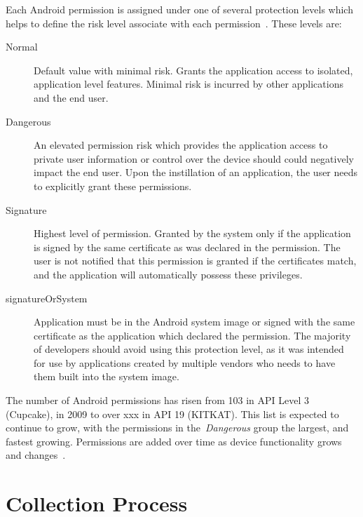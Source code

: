 \documentclass{sig-alternate}
\begin{document}
Each Android permission is assigned under one of several protection levels which helps to define the risk level associate with each permission~\cite{permissionLevelsURL}. These levels are:

\begin{description}
  \item[Normal] Default value with minimal risk. Grants the application access to isolated, application level features. Minimal risk is incurred by other applications and the end user.
  \item[Dangerous] An elevated permission risk which provides the application access to private user information or control over the device should could negatively impact the end user. Upon the instillation of an application, the user needs to explicitly grant these permissions.
\item[Signature] Highest level of permission. Granted by the system only if the application is signed by the same certificate as was declared in the permission. The user is not notified that this permission is granted if the certificates match, and the application will automatically possess these privileges. 
  \item[signatureOrSystem] Application must be in the Android system image or signed with the same certificate as the application which declared the permission. The majority of developers should avoid using this protection level, as it was intended for use by applications created by multiple vendors who needs to have them built into the system image. 

\end{description}


The number of Android permissions has risen from 103 in API Level 3 (Cupcake), in 2009 to over xxx in API 19 (KITKAT). This list is expected to continue to grow, with the permissions in the~\emph{Dangerous} group the largest, and fastest growing. Permissions are added over time as device functionality grows and changes~\cite{Wei:2012:PEA:2420950.2420956}.






\section{Collection Process}
\end{document}
